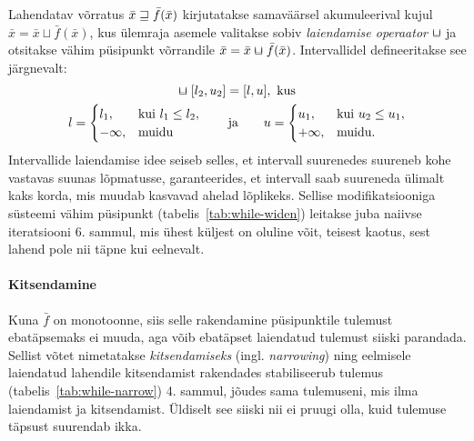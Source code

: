 \documentclass[../thesis.tex]{subfiles}
\begin{document}
Lahendatav võrratus $\bar{x} \sqsupseteq \bar{f}(\bar{x})$ kirjutatakse samaväärsel akumuleerival kujul $\bar{x} = \bar{x} \sqcup \bar{f}(\bar{x})$, kus ülemraja asemele valitakse sobiv \emph{laiendamise operaator} $\widen$ ja otsitakse vähim püsipunkt võrrandile $\bar{x} = \bar{x} \widen \bar{f}(\bar{x})$. Intervallidel defineeritakse see järgnevalt:
\begin{gather*}
	[l_1, u_1] \widen [l_2, u_2] = [l, u], \text{ kus} \\
	l = \begin{cases}
		l_1, & \text{kui } l_1 \leq l_2, \\
		-\infty, & \text{muidu}
	\end{cases}
	\qquad \text{ja} \qquad
	u = \begin{cases}
		u_1, & \text{kui } u_2 \leq u_1, \\
		+\infty, & \text{muidu}.
	\end{cases}
\end{gather*}
Intervallide laiendamise idee seiseb selles, et intervall suurenedes suureneb kohe vastavas suunas lõpmatusse, garanteerides, et intervall saab suureneda ülimalt kaks korda, mis muudab kasvavad ahelad lõplikeks. Sellise modifikatsiooniga süsteemi vähim püsipunkt (tabelis~\ref{tab:while-widen}) leitakse juba naiivse iteratsiooni 6. sammul, mis ühest küljest on oluline võit, teisest kaotus, sest lahend pole nii täpne kui eelnevalt.

\paragraph{Kitsendamine}
Kuna $\bar{f}$ on monotoonne, siis selle rakendamine püsipunktile tulemust ebatäpsemaks ei muuda, aga võib ebatäpset laiendatud tulemust siiski parandada. Sellist võtet nimetatakse \emph{kitsendamiseks} (ingl. \textit{narrowing}) ning eelmisele laiendatud lahendile kitsendamist rakendades stabiliseerub tulemus (tabelis~\ref{tab:while-narrow}) 4. sammul, jõudes sama tulemuseni, mis ilma laiendamist ja kitsendamist. Üldiselt see siiski nii ei pruugi olla, kuid tulemuse täpsust suurendab ikka.
\end{document}
